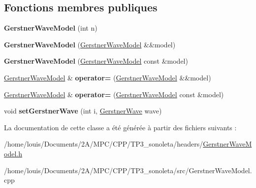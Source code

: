 \subsection*{Fonctions membres publiques}
\begin{DoxyCompactItemize}
\item 
\mbox{\label{class_gerstner_wave_model_ab600b7a3f7455d94ff0069fa47b355bc}} 
{\bfseries Gerstner\+Wave\+Model} (int n)
\item 
\mbox{\label{class_gerstner_wave_model_adc09d3aaaee69d0e66d776d93c807d37}} 
{\bfseries Gerstner\+Wave\+Model} (\hyperlink{class_gerstner_wave_model}{Gerstner\+Wave\+Model} \&\&model)
\item 
\mbox{\label{class_gerstner_wave_model_afa36f5bb46de8f5be4b12d2b4e22cefb}} 
{\bfseries Gerstner\+Wave\+Model} (\hyperlink{class_gerstner_wave_model}{Gerstner\+Wave\+Model} const \&model)
\item 
\mbox{\label{class_gerstner_wave_model_a368e6ba6e59bb5ae666ddd3b11166f49}} 
\hyperlink{class_gerstner_wave_model}{Gerstner\+Wave\+Model} \& {\bfseries operator=} (\hyperlink{class_gerstner_wave_model}{Gerstner\+Wave\+Model} \&\&model)
\item 
\mbox{\label{class_gerstner_wave_model_ae57c58cad23189d3ddb97d7520c01341}} 
\hyperlink{class_gerstner_wave_model}{Gerstner\+Wave\+Model} \& {\bfseries operator=} (\hyperlink{class_gerstner_wave_model}{Gerstner\+Wave\+Model} const \&model)
\item 
\mbox{\label{class_gerstner_wave_model_ac984a0700f00aac266b97973cc13b636}} 
void {\bfseries set\+Gerstner\+Wave} (int i, \hyperlink{class_gerstner_wave}{Gerstner\+Wave} wave)
\end{DoxyCompactItemize}


La documentation de cette classe a été générée à partir des fichiers suivants \+:\begin{DoxyCompactItemize}
\item 
/home/louis/\+Documents/2\+A/\+M\+P\+C/\+C\+P\+P/\+T\+P3\+\_\+sonoleta/headers/\hyperlink{_gerstner_wave_model_8h}{Gerstner\+Wave\+Model.\+h}\item 
/home/louis/\+Documents/2\+A/\+M\+P\+C/\+C\+P\+P/\+T\+P3\+\_\+sonoleta/src/Gerstner\+Wave\+Model.\+cpp\end{DoxyCompactItemize}
